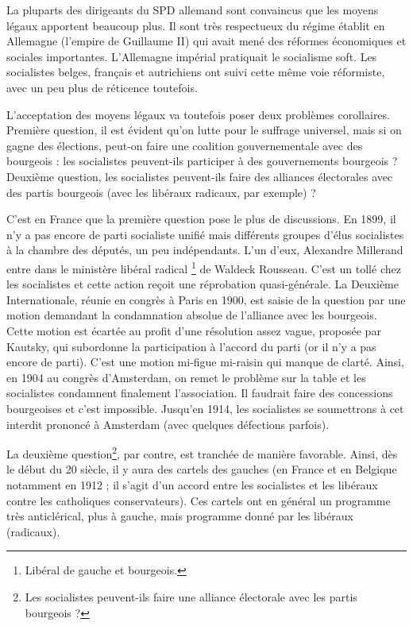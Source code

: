 \documentclass[12pt]{report}
\begin{document}
La pluparts des dirigeants du SPD allemand sont convaincus que les moyens légaux apportent beaucoup plus. 
Il sont très respectueux du régime établit en Allemagne (l'empire de Guillaume II) qui avait mené des réformes économiques et sociales importantes.
L’Allemagne impérial pratiquait le socialisme soft. 
Les socialistes belges, français et autrichiens ont suivi cette même voie réformiste, avec un peu plus de réticence toutefois.

L’acceptation des moyens légaux va toutefois poser deux problèmes corollaires.
Première question, il est évident qu'on lutte pour le suffrage universel, mais si on gagne des élections, peut-on faire une coalition gouvernementale avec des bourgeois : les socialistes peuvent-ils participer à des gouvernements bourgeois ?
Deuxième question, les socialistes peuvent-ils faire des alliances électorales avec des partis bourgeois (avec les libéraux radicaux, par exemple) ?

C'est en France que la première question pose le plus de discussions. 
En 1899, il n’y a pas encore de parti socialiste unifié mais différents groupes d’élus socialistes à la chambre des députés, un peu indépendants. 
L'un d'eux, Alexandre Millerand entre dans le ministère libéral radical \footnote{Libéral de gauche et bourgeois.} de Waldeck Rousseau.
C’est un tollé chez les socialistes et cette action reçoit une réprobation quasi-générale. 
La Deuxième Internationale, réunie en congrès à Paris en 1900, est saisie de la question par une motion demandant la condamnation absolue de l’alliance avec les bourgeois.
Cette motion est écartée au profit d’une résolution assez vague, proposée par Kautsky, qui subordonne la participation à l’accord du parti (or il n’y a pas encore de parti). 
C’est une motion mi-figue mi-raisin qui manque de clarté. 
Ainsi, en 1904 au congrès d’Amsterdam, on remet le problème sur la table et les socialistes condamnent finalement l’association. 
Il faudrait faire des concessions bourgeoises et c’est impossible. 
Jusqu’en 1914, les socialistes se soumettrons à cet interdit prononcé à Amsterdam (avec quelques défections parfois).

La deuxième question\footnote{Les socialistes peuvent-ils faire une alliance électorale avec les partis bourgeois ?}, par contre, est tranchée de manière favorable.
Ainsi, dès le début du 20 siècle, il y aura des cartels des gauches (en France et en Belgique notamment en 1912 ; il s’agit d’un accord entre les socialistes et les libéraux contre les catholiques conservateurs).
Ces cartels ont en général un programme très anticlérical, plus à gauche, mais programme donné par les libéraux (radicaux).
\end{document}
